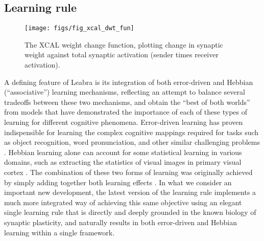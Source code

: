 \documentclass[11pt,twoside]{article}
\begin{document}
\subsection{Learning rule}

\begin{figure}
  \centering\texttt{[image: figs/fig\_xcal\_dwt\_fun]}
  \caption{\small The XCAL weight change function, plotting change in
    synaptic weight against total synaptic activation (sender times receiver
    activation).}
  \label{fig.xcal_fun}
\end{figure}

A defining feature of Leabra is its integration of both error-driven and
Hebbian (``associative'') learning mechanisms, reflecting an attempt to
balance several tradeoffs between these two mechanisms, and obtain the ``best
of both worlds'' from models that have demonstrated the importance of each of
these types of learning for different cognitive phenomena.  Error-driven
learning has proven indispensible for learning the complex cognitive mappings
required for tasks such as object recognition, word pronunciation, and other
similar challenging problems \cite{OReilly96b,OReilly98,OReillyMunakata00}.  Hebbian
learning alone can account for some statistical learning in various domains,
such as extracting the statistics of visual images in primary visual cortex
\cite{OlshausenField96,OlshausenField97}.  The combination of these two forms
of learning was originally achieved by simply adding together both learning
effects \cite{OReillyMunakata00}.  In what we consider an important new
development, the latest version of the learning rule implements a much more
integrated way of achieving this same objective using an elegant single
learning rule that is directly and deeply grounded in the known biology of
synaptic plasticity, and naturally results in both error-driven and Hebbian
learning within a single framework.
\end{document}
